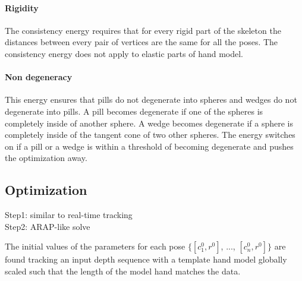 \paragraph{Rigidity}
The consistency energy requires that for every rigid part of the skeleton the distances between every pair of vertices are the same for all the poses. The consistency energy does not apply to elastic parts of hand model.

\paragraph{Non degeneracy}
This energy ensures that pills do not degenerate into spheres and wedges do not degenerate into pills.
A pill becomes degenerate if one of the spheres is completely inside of another sphere. A wedge becomes degenerate if a sphere is completely inside of the tangent cone of two other spheres. The energy switches on if a pill or a wedge is within a threshold of becoming degenerate and pushes the optimization away.


\subsection{Optimization}
Step1: similar to real-time tracking\\
Step2: ARAP-like solve\\

\begin{DRAFT}
The initial values of the parameters for each pose  $\{[c^0_1 , r^0]$, ..., $[c^0_n, r^0]\}$ are found tracking an input depth sequence with a template hand model globally scaled such that the length of the model hand matches the data.
\end{DRAFT}

